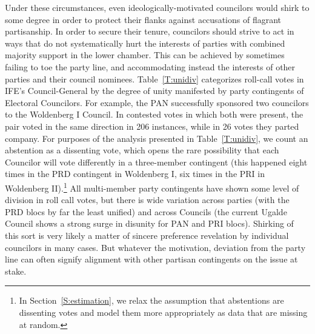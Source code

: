 \documentclass[12 pt, letter]{article}
\begin{document}
Under these circumstances, even ideologically-motivated councilors would shirk to some degree in order to protect their flanks against accusations of flagrant partisanship.  In order to secure their tenure, councilors should strive to act in ways that do not systematically hurt the interests of parties with combined majority support in the lower chamber.  This can be achieved by sometimes failing to toe the party line, and accommodating instead the interests of other parties and their council nominees.  Table~\ref{T:unidiv} categorizes roll-call votes in IFE's Council-General by the degree of unity manifested by party contingents of Electoral Councilors.  For example, the PAN successfully sponsored two councilors to the Woldenberg I Council.  In contested votes in which both were present, the pair voted in the same direction in 206 instances, while in 26 votes they parted company.  For purposes of the analysis presented in Table~\ref{T:unidiv}, we count an abstention as a dissenting vote, which opens the rare possibility that each Councilor will vote differently in a three-member contingent (this happened eight times in the PRD contingent in Woldenberg I, six times in the PRI in Woldenberg II).\footnote{In Section~\ref{S:estimation}, we relax the assumption that abstentions are dissenting votes and model them more appropriately as data that are missing at random.} All multi-member party contingents have shown some level of division in roll call votes, but there is wide variation across parties (with the PRD blocs by far the least unified) and across Councils (the current Ugalde Council shows a strong surge in disunity for PAN and PRI blocs). Shirking of this sort is very likely a matter of sincere preference revelation by individual councilors in many cases.  But whatever the motivation, deviation from the party line can often signify alignment with other partisan contingents on the issue at stake.
\end{document}
